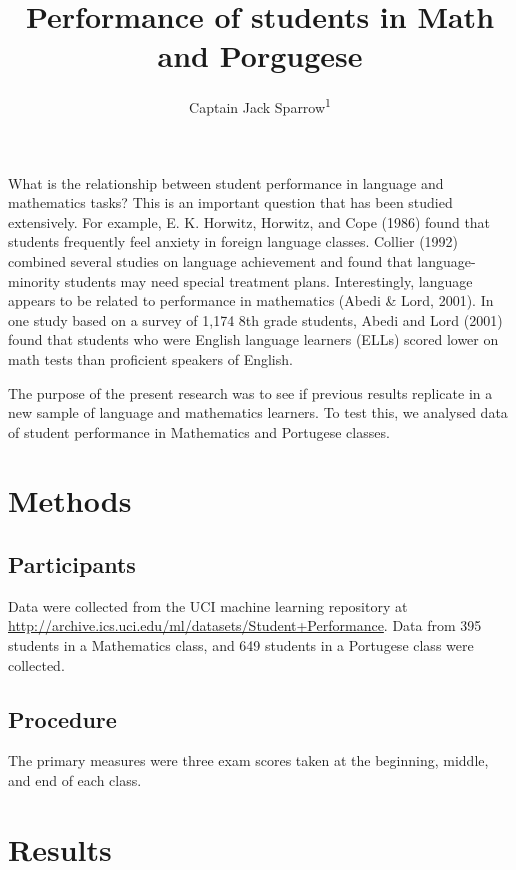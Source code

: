 \documentclass[english,floatsintext,man]{apa6}
\title{Performance of students in Math and Porgugese}
\author{Captain Jack Sparrow\textsuperscript{1}}
\affiliation{
    \vspace{0.5cm}
          \textsuperscript{1} University of Basel  }
\theoremstyle{definition}
\theoremstyle{definition}
\theoremstyle{definition}
\theoremstyle{remark}
\begin{document}
\maketitle

\setcounter{secnumdepth}{0}



What is the relationship between student performance in language and
mathematics tasks? This is an important question that has been studied
extensively. For example, E. K. Horwitz, Horwitz, and Cope (1986) found
that students frequently feel anxiety in foreign language classes.
Collier (1992) combined several studies on language achievement and
found that language-minority students may need special treatment plans.
Interestingly, language appears to be related to performance in
mathematics (Abedi \& Lord, 2001). In one study based on a survey of
1,174 8th grade students, Abedi and Lord (2001) found that students who
were English language learners (ELLs) scored lower on math tests than
proficient speakers of English.

The purpose of the present research was to see if previous results
replicate in a new sample of language and mathematics learners. To test
this, we analysed data of student performance in Mathematics and
Portugese classes.

\section{Methods}\label{methods}

\subsection{Participants}\label{participants}

Data were collected from the UCI machine learning repository at
\url{http://archive.ics.uci.edu/ml/datasets/Student+Performance}. Data
from 395 students in a Mathematics class, and 649 students in a
Portugese class were collected.

\subsection{Procedure}\label{procedure}

The primary measures were three exam scores taken at the beginning,
middle, and end of each class.

\section{Results}\label{results}
\end{document}
